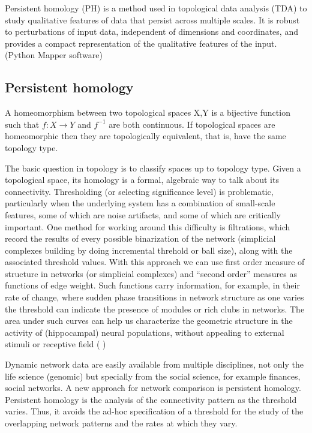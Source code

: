 \documentclass[onecollarge,runningheads]{svjour2}
\begin{document}
Persistent homology (PH) is a method used in topological data analysis (TDA) to study qualitative features of data that persist across multiple scales. It is robust to perturbations of input data, independent of dimensions and coordinates, and provides a compact representation of the qualitative features of the input. (Python Mapper software) 


\subsection{Persistent homology}
\label{sec:1}
A homeomorphism between two topological spaces X,Y is a bijective function such that $f:X \to Y$ and $f^{-1}$ are both continuous. If topological spaces are homeomorphic then they are topologically equivalent, that is, have the same topology type.

The basic question in topology is to classify spaces up to topology type.
Given a topological space, its homology is a formal, algebraic way to talk about its connectivity.
Thresholding (or selecting significance level) is problematic, particularly when the underlying system has a combination of small-scale features, some of which are noise artifacts, and some of which are critically important.  %
One method for working around this difficulty is filtrations, which record the results of every possible binarization of the network (simplicial complexes building by doing incremental threhold or ball size), along with the associated threshold values. With this approach we can use first order measure of structure in networks (or simplicial complexes) and  “second order” measures as functions of edge weight. Such functions carry information, for example, in their rate of change, where sudden phase transitions in network structure as one varies the threshold can indicate the presence of modules or rich clubs in networks. The area under such curves can help us characterize the geometric structure in the activity of (hippocampal) neural populations, without appealing to external stimuli or receptive field ( \citep{giusti2015clique})

Dynamic network data are easily available from multiple disciplines, not only the life science (genomic) but specially from the social science, for example finances, social networks. A new approach for network comparison is persistent homology. Persistent homology is the analysis of the connectivity pattern as the threshold varies. Thus, it avoids the ad-hoc specification of a threshold for the study of the overlapping network patterns and the rates at which they vary.
\end{document}
